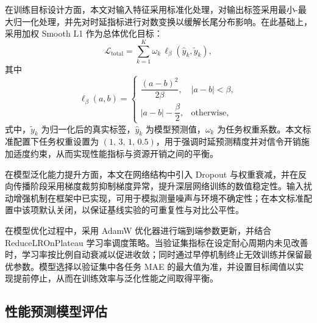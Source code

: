 在训练目标设计方面，本文对输入特征采用标准化处理，对输出标签采用最小-最大归一化处理，并先对时延指标进行对数变换以缓解长尾分布影响。在此基础上，采用加权 Smooth L1 作为总体优化目标：
\begin{equation}
\mathcal{L}_{\text{total}}
=
\sum_{k=1}^{K}
\omega_k\,
\ell_{\beta}\!\left(\hat{y}_k,\tilde{y}_k\right),
\end{equation}
其中
\begin{equation}
\ell_{\beta}(a,b)=
\begin{cases}
\dfrac{(a-b)^2}{2\beta}, & |a-b|<\beta,\\[4pt]
|a-b|-\dfrac{\beta}{2}, & \text{otherwise},
\end{cases}
\end{equation}
式中，$\tilde{y}_k$ 为归一化后的真实标签，$\hat{y}_k$ 为模型预测值，$\omega_k$ 为任务权重系数。本文标准配置下任务权重设置为 $(1,\,3,\,1,\,0.5)$，用于强调时延预测精度并对信令开销施加适度约束，从而实现性能指标与资源开销之间的平衡。

在模型泛化能力提升方面，本文在网络结构中引入 Dropout 与权重衰减，并在反向传播阶段采用梯度裁剪抑制梯度异常，提升深层网络训练的数值稳定性。输入扰动增强机制在框架中已实现，可用于模拟测量噪声与环境不确定性；在本文标准配置中该项默认关闭，以保证基线实验的可重复性与对比公平性。

在模型优化过程中，采用 AdamW 优化器进行端到端参数更新，并结合 ReduceLROnPlateau 学习率调度策略。当验证集指标在设定耐心周期内未见改善时，学习率按比例自动衰减以促进收敛；同时通过早停机制终止无效训练并保留最优参数。模型选择以验证集中各任务 MAE 的最大值为准，并设置目标阈值以实现提前停止，从而在训练效率与泛化性能之间取得平衡。


\subsection{性能预测模型评估}
\label{subsec:visual_results}


